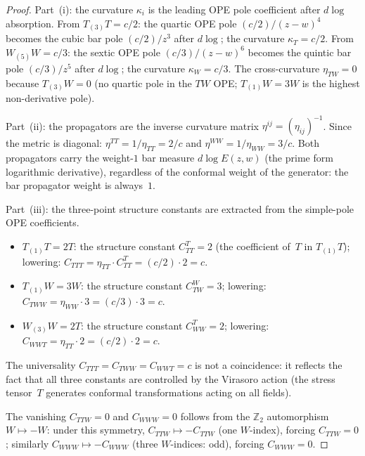 \documentclass[11pt,reqno]{amsart}
\theoremstyle{definition}
\theoremstyle{remark}
\numberwithin{equation}{section}
\begin{document}
\begin{proof}
Part~(i): the curvature $\kappa_i$ is the leading OPE
pole coefficient after $d\!\log$ absorption.
From $T_{(3)}T = c/2$: the quartic OPE pole
$(c/2)/(z-w)^4$ becomes the cubic bar pole
$(c/2)/z^3$ after $d\!\log$; the curvature $\kappa_T = c/2$.
From $W_{(5)}W = c/3$: the sextic OPE pole
$(c/3)/(z-w)^6$ becomes the quintic bar pole
$(c/3)/z^5$ after $d\!\log$; the curvature $\kappa_W = c/3$.
The cross-curvature $\eta_{TW} = 0$ because
$T_{(3)}W = 0$ (no quartic pole in the $TW$ OPE;
$T_{(1)}W = 3W$ is the highest non-derivative pole).

Part~(ii): the propagators are the inverse curvature matrix
$\eta^{ij} = (\eta_{ij})^{-1}$. Since the metric is
diagonal: $\eta^{TT} = 1/\eta_{TT} = 2/c$ and
$\eta^{WW} = 1/\eta_{WW} = 3/c$. Both propagators carry
the weight-$1$ bar measure $d\!\log E(z,w)$ (the prime form
logarithmic derivative), regardless of the conformal weight
of the generator: the bar propagator weight is always~$1$.

Part~(iii): the three-point structure constants are
extracted from the simple-pole OPE coefficients.
\begin{itemize}
\item $T_{(1)}T = 2T$: the structure constant
 $C^T_{TT} = 2$ (the coefficient of~$T$ in $T_{(1)}T$);
 lowering: $C_{TTT} = \eta_{TT} \cdot C^T_{TT}
 = (c/2) \cdot 2 = c$.
\item $T_{(1)}W = 3W$: the structure constant
 $C^W_{TW} = 3$; lowering: $C_{TWW} = \eta_{WW} \cdot 3
 = (c/3) \cdot 3 = c$.
\item $W_{(3)}W = 2T$: the structure constant
 $C^T_{WW} = 2$; lowering: $C_{WWT} = \eta_{TT} \cdot 2
 = (c/2) \cdot 2 = c$.
\end{itemize}
The universality $C_{TTT} = C_{TWW} = C_{WWT} = c$ is not
a coincidence: it reflects the fact that all three constants
are controlled by the Virasoro action (the stress tensor~$T$
generates conformal transformations acting on all fields).

The vanishing $C_{TTW} = 0$ and $C_{WWW} = 0$ follows from
the $\mathbb{Z}_2$ automorphism $W \mapsto -W$: under this
symmetry, $C_{TTW} \mapsto -C_{TTW}$ (one $W$-index),
forcing $C_{TTW} = 0$; similarly $C_{WWW} \mapsto -C_{WWW}$
(three $W$-indices: odd), forcing $C_{WWW} = 0$.
\end{proof}
\end{document}
